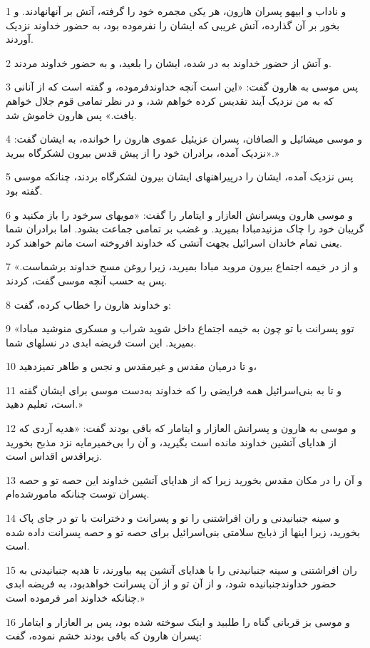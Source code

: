\par 1 و ناداب و ابیهو پسران هارون، هر یکی مجمره خود را گرفته، آتش بر آنهانهادند. و بخور بر آن گذارده، آتش غریبی که ایشان را نفرموده بود، به حضور خداوند نزدیک آوردند.
\par 2 و آتش از حضور خداوند به در شده، ایشان را بلعید، و به حضور خداوند مردند.
\par 3 پس موسی به هارون گفت: «این است آنچه خداوندفرموده، و گفته است که از آنانی که به من نزدیک آیند تقدیس کرده خواهم شد، و در نظر تمامی قوم جلال خواهم یافت.» پس هارون خاموش شد.
\par 4 و موسی میشائیل و الصافان، پسران عزیئیل عموی هارون را خوانده، به ایشان گفت: «نزدیک آمده، برادران خود را از پیش قدس بیرون لشکرگاه ببرید.»
\par 5 پس نزدیک آمده، ایشان را در‌پیراهنهای ایشان بیرون لشکرگاه بردند، چنانکه موسی گفته بود.
\par 6 و موسی هارون وپسرانش العازار و ایتامار را گفت: «مویهای سرخود را باز مکنید و گریبان خود را چاک مزنیدمبادا بمیرید. و غضب بر تمامی جماعت بشود. اما برادران شما یعنی تمام خاندان اسرائیل بجهت آتشی که خداوند افروخته است ماتم خواهند کرد.
\par 7 و از در خیمه اجتماع بیرون مروید مبادا بمیرید، زیرا روغن مسح خداوند برشماست.» پس به حسب آنچه موسی گفت، کردند.
\par 8 و خداوند هارون را خطاب کرده، گفت:
\par 9 «توو پسرانت با تو چون به خیمه اجتماع داخل شوید شراب و مسکری منوشید مبادا بمیرید. این است فریضه ابدی در نسلهای شما.
\par 10 و تا درمیان مقدس و غیرمقدس و نجس و طاهر تمیزدهید،
\par 11 و تا به بنی‌اسرائیل همه فرایضی را که خداوند به‌دست موسی برای ایشان گفته است، تعلیم دهید.»
\par 12 و موسی به هارون و پسرانش العازار و ایتامار که باقی بودند گفت: «هدیه آردی که از هدایای آتشین خداوند مانده است بگیرید، و آن را بی‌خمیرمایه نزد مذبح بخورید زیراقدس اقداس است.
\par 13 و آن را در مکان مقدس بخورید زیرا که از هدایای آتشین خداوند این حصه تو و حصه پسران توست چنانکه مامورشده‌ام.
\par 14 و سینه جنبانیدنی و ران افراشتنی را تو و پسرانت و دخترانت با تو در جای پاک بخورید، زیرا اینها از ذبایح سلامتی بنی‌اسرائیل برای حصه تو و حصه پسرانت داده شده است.
\par 15 ران افراشتنی و سینه جنبانیدنی را با هدایای آتشین پیه بیاورند، تا هدیه جنبانیدنی به حضور خداوندجنبانیده شود، و از آن تو و از آن پسرانت خواهدبود، به فریضه ابدی چنانکه خداوند امر فرموده است.»
\par 16 و موسی بز قربانی گناه را طلبید و اینک سوخته شده بود، پس بر العازار و ایتامار پسران هارون که باقی بودند خشم نموده، گفت:
